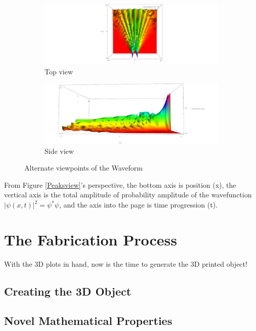 \documentclass[12pt]{article}
\begin{document}
\begin{figure}
\centering
\begin{subfigure}{.5\textwidth}
  \centering
  \includegraphics[width=1.1\textwidth]{MATH_646_Project_Group_4/topView.jpg}
  \caption{Top view}
  \label{Topview}
\end{subfigure}%
\begin{subfigure}{.5\textwidth}
  \centering
  \includegraphics[width=1.1\textwidth]{MATH_646_Project_Group_4/sideView.jpg}
  \caption{Side view}
  \label{Sideview}
\end{subfigure}
\caption{Alternate viewpoints of the Waveform}
\label{Pictures}
\end{figure}

From Figure \ref{Peaksview}'s perspective, the bottom axis is position (x), the vertical axis is the total amplitude of probability amplitude of the wavefunction $|\psi(x,t)|^2 = \psi^*\psi$, and the axis into the page is time progression (t).

\section{ The Fabrication Process}
With the 3D plots in hand, now is the time to generate the 3D printed object!
\subsection{Creating the 3D Object}

\subsection{Novel Mathematical Properties}
\end{document}
